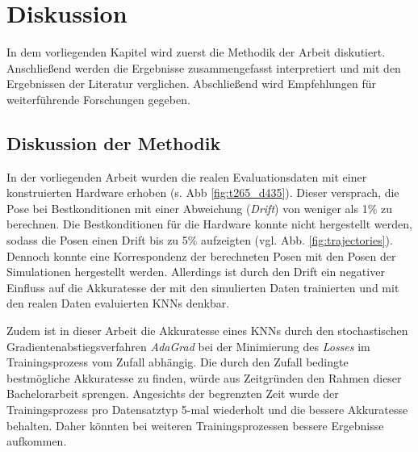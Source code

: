 
\section{Diskussion}
\label{sec:kapitel_5}
In dem vorliegenden Kapitel wird zuerst die Methodik der Arbeit diskutiert. Anschließend werden die Ergebnisse zusammengefasst interpretiert und mit den Ergebnissen der Literatur verglichen. Abschließend wird Empfehlungen für weiterführende Forschungen gegeben. 


\subsection{Diskussion der Methodik}
\label{subsec:disc_methode}

In der vorliegenden Arbeit wurden die realen Evaluationsdaten mit einer konstruierten Hardware erhoben (s. Abb \ref{fig:t265_d435}). Dieser versprach, die Pose bei Bestkonditionen mit einer Abweichung (\textit{Drift}) von weniger als 1\% zu berechnen. Die Bestkonditionen für die Hardware konnte nicht hergestellt werden, sodass die Posen einen Drift bis zu 5\% aufzeigten (vgl. Abb. \ref{fig:trajectories}). Dennoch konnte eine Korrespondenz der berechneten Posen mit den Posen der Simulationen hergestellt werden. Allerdings ist durch den Drift ein negativer Einfluss auf die Akkuratesse der mit den simulierten Daten trainierten und mit den realen Daten evaluierten KNNs denkbar.


Zudem ist in dieser Arbeit die Akkuratesse eines KNNs durch den stochastischen Gradientenabstiegsverfahren \textit{AdaGrad} bei der Minimierung des \textit{Losses} im Trainingsprozess vom Zufall abhängig. Die durch den Zufall bedingte bestmögliche Akkuratesse zu finden, würde aus Zeitgründen den Rahmen dieser Bachelorarbeit sprengen. Angesichts der begrenzten Zeit wurde der Trainingsprozess pro Datensatztyp 5-mal wiederholt und die bessere Akkuratesse behalten. Daher könnten bei weiteren Trainingsprozessen bessere Ergebnisse aufkommen.

